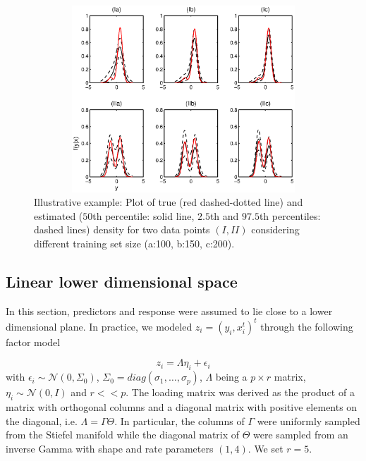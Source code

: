 \documentclass{article} %
\providecommand{\mc}[1]{\mathcal{#1}}
\begin{document}
\begin{figure}[h!]
\centering
\includegraphics[width=120mm,height=70mm]{ch3_density.eps}
\caption{Illustrative example: Plot of true (red dashed-dotted line) and estimated ($50$th percentile: solid line, $2.5$th and $97.5$th percentiles: dashed lines) density for two data points $(I, II)$ considering different training set size (a:100, b:150, c:200). } \label{plotDensity}
\end{figure}



\subsection{Linear lower dimensional space} \label{section:linear}


In this section, predictors and response were assumed to lie close to a lower dimensional plane. In practice, we modeled $z_i=(y_i,x_i^t)^t$ through the following factor model

\begin{equation} z_i=\Lambda \eta_i + \epsilon_i \end{equation} 
with $\epsilon_i \sim \mc{N}(0,\Sigma_0)$, $\Sigma_0=diag(\sigma_1, \ldots, \sigma_p)$, $\Lambda$ being a $p \times r$ matrix, $\eta_i \sim \mc{N}(0,I)$ and $r<<p$. The loading matrix was derived as the product of a matrix with orthogonal columns and a diagonal matrix with positive elements on the diagonal, i.e. $\Lambda=\Gamma \Theta$. In particular, the columns of $\Gamma$ were uniformly sampled from the Stiefel manifold while the diagonal matrix of $\Theta$ were sampled from an inverse Gamma with shape and rate parameters $(1,4)$. We set $r=5$.
\end{document}
